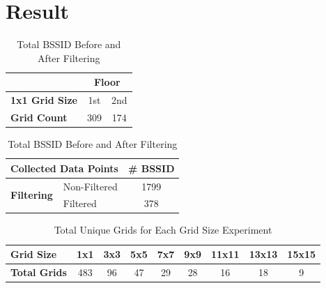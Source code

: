 \documentclass[runningheads]{llncs}
\begin{document}
\section{Result}
\vspace{-5pt}
\begin{table}[H]
	\centering
	\begin{minipage}{0.42\textwidth}
		\centering
		\caption{Total True Unique Grids by Floor}
		\label{tab:true_unique_grid}
		\vspace{2pt}
		\small
		\begin{tabular}{|l|c|c|} 
			\hline
			& \multicolumn{2}{c|}{\textbf{Floor}}  \\ 
			\hline
			\textbf{1x1 Grid Size} & 1st & 2nd \\ 
			\hline
			\textbf{Grid Count} & 309 & 174 \\
			\hline
		\end{tabular}
	\end{minipage}
	\hfill
	\begin{minipage}{0.52\textwidth}
		\centering
		\caption{Total BSSID Before and After Filtering}
		\label{tab:bssid_counts}
		\vspace{2pt}
		\small
		\begin{tabular}{|l|l|c|}
			\hline
			\multicolumn{2}{|l|}{\textbf{Collected Data Points}} & \textbf{\# BSSID} \\
			\hline
			\multirow{2}{*}{\textbf{Filtering}} & Non-Filtered & 1799 \\
			\cline{2-3}
			& Filtered & 378 \\
			\hline
		\end{tabular}
	\end{minipage}
\end{table}
\vspace{-20pt}
\begin{table}[H]
	\caption{Total Unique Grids for Each Grid Size Experiment}
	\label{tab:grid_size_variations}
	\vspace{2pt}
	\centering
	\small
	\begin{tabular}{|l|c|c|c|c|c|c|c|c|} 
		\hline
		\textbf{Grid Size} & 1x1 & 3x3 & 5x5 & 7x7 & 9x9 & 11x11 & 13x13 & 15x15 \\ 
		\hline
		\textbf{Total Grids} & 483 & 96 & 47 & 29 & 28 & 16 & 18 & 9 \\
		\hline
	\end{tabular}
\end{table}
\vspace{-15pt}
\end{document}

